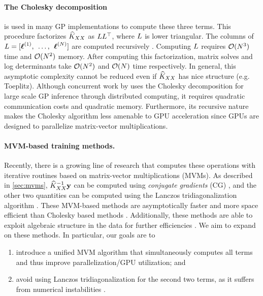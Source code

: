 \paragraph{The Cholesky decomposition} is used in many GP implementations to compute these three terms.
This procedure factorizes $\widehat{K}_{XX}$ as $L L^\top$, where $L$ is lower triangular.
The columns of $L = [ \boldsymbol{\ell}^{(1)}, \:\: \ldots, \:\: \boldsymbol{\ell}^{(N)} ]$ are computed recursively \citep{golub2012matrix}.
Computing $L$ requires $\bigo{N^3}$ time and $\bigo{N^2}$ memory.
After computing this factorization, matrix solves and log determinants take $\bigo{N^2}$ and $\bigo{N}$ time respectively.
In general, this asymptotic complexity cannot be reduced even if $\widehat{K}_{XX}$ has nice structure (e.g. Toeplitz).
Although concurrent work by \citet{nguyen2019exact} uses the Cholesky decomposition for large scale GP inference through distributed computing, it requires quadratic communication costs and quadratic memory.
Furthermore, its recursive nature makes the Cholesky algorithm less amenable to GPU acceleration since GPUs are designed to parallelize matrix-vector multiplications.

\paragraph{MVM-based training methods.}
Recently, there is a growing line of research that computes these operations with iterative routines based on matrix-vector multiplications (MVMs).
As described in \cref{sec:mvms},
$\widehat{K}_{XX}^{-1}\mathbf{y}$ can be computed using \emph{conjugate gradients} (CG) \cite{cunningham2008fast,cutajar2016preconditioning},
and the other two quantities can be computed using the Lanczos tridiagonalization algorithm \cite{ubaru2017fast,dong2017scalable}.
These MVM-based methods are asymptotically faster and more space efficient than Cholesky based methods \cite{wilson2015kernel,dong2017scalable}.
Additionally, these methods are able to exploit algebraic structure in the data for further efficiencies \cite{cunningham2008fast,saatcci2012scalable,wilson2015kernel}.
We aim to expand on these methods.
In particular, our goals are to
\begin{enumerate}
  \item introduce a unified MVM algorithm that simultaneously computes all terms and thus improve parallelization/GPU utilization; and
  \item avoid using Lanczos tridiagonalization for the second two terms, as it suffers from numerical instabilities \cite{golub2012matrix}.
\end{enumerate}

